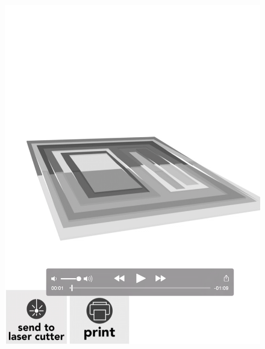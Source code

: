 \begin{figure}[htbp]
\centering
\includegraphics{figures/92_Appendix_Visual_Aids_Materials/video_card4.png}
\caption{}
\end{figure}

